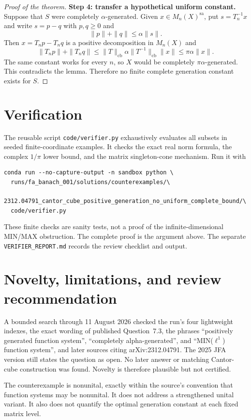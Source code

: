 \documentclass[11pt]{article}
\theoremstyle{definition}
\newcommand{\sa}{\mathrm{sa}}
\begin{document}
\begin{proof}[Proof of the theorem]
\textbf{Step 4: transfer a hypothetical uniform constant.}
Suppose that $S$ were completely $\alpha$-generated.  Given
$x\in M_n(X)^\sa$, put $s=T_n^{-1}x$ and write $s=p-q$ with $p,q\geq0$ and
\[
 \|p\|+\|q\|\leq\alpha\|s\|.
\]
Then $x=T_np-T_nq$ is a positive decomposition in $M_n(X)$ and
\[
 \|T_np\|+\|T_nq\|
 \leq \|T\|_{\mathrm{cb}}\alpha\|T^{-1}\|_{\mathrm{cb}}\|x\|
 \leq \pi\alpha\|x\|.
\]
The same constant works for every $n$, so $X$ would be completely
$\pi\alpha$-generated.  This contradicts the lemma.  Therefore no finite
complete generation constant exists for $S$.
\end{proof}

\section{Verification}

The reusable script \texttt{code/verifier.py} exhaustively evaluates all
subsets in seeded finite-coordinate examples.  It checks the exact real norm
formula, the complex $1/\pi$ lower bound, and the matrix singleton-cone
mechanism.  Run it with
\begin{verbatim}
conda run --no-capture-output -n sandbox python \
  runs/fa_banach_001/solutions/counterexamples/\
  2312.04791_cantor_cube_positive_generation_no_uniform_complete_bound/\
  code/verifier.py
\end{verbatim}
These finite checks are sanity tests, not a proof of the infinite-dimensional
MIN/MAX obstruction.  The complete proof is the argument above.  The separate
\texttt{VERIFIER\_REPORT.md} records the review checklist and output.

\section{Novelty, limitations, and review recommendation}

A bounded search through 11 August 2026 checked the run's four lightweight
indexes, the exact wording of published Question~7.3, the phrases
``positively generated function system'', ``completely alpha-generated'',
and ``MIN($\ell^1$) function system'', and later sources citing
arXiv:2312.04791.  The 2025 JFA version still states the question as open.
No later answer or matching Cantor-cube construction was found.  Novelty is
therefore plausible but not certified.

The counterexample is nonunital, exactly within the source's convention that
function systems may be nonunital.  It does not address a strengthened unital
variant.  It also does not quantify the optimal generation constant at each
fixed matrix level.
\end{document}
